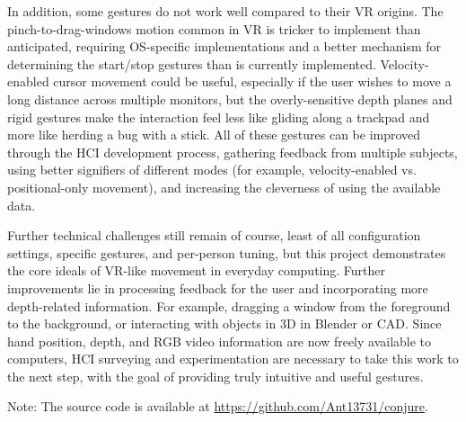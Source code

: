 \documentclass[12pt]{article}
\begin{document}
In addition, some gestures do not work well compared to their VR origins. The pinch-to-drag-windows motion common in VR is tricker to implement than anticipated, requiring OS-specific implementations and a better mechanism for determining the start/stop gestures than is currently implemented. Velocity-enabled cursor movement could be useful, especially if the user wishes to move a long distance across multiple monitors, but the overly-sensitive depth planes and rigid gestures make the interaction feel less like gliding along a trackpad and more like herding a bug with a stick. All of these gestures can be improved through the HCI development process, gathering feedback from multiple subjects, using better signifiers of different modes (for example, velocity-enabled vs. positional-only movement), and increasing the cleverness of using the available data.

Further technical challenges still remain of course, least of all configuration settings, specific gestures, and per-person tuning, but this project demonstrates the core ideals of VR-like movement in everyday computing. Further improvements lie in processing feedback for the user and incorporating more depth-related information. For example, dragging a window from the foreground to the background, or interacting with objects in 3D in Blender or CAD. Since hand position, depth, and RGB video information are now freely available to computers, HCI surveying and experimentation are necessary to take this work to the next step, with the goal of providing truly intuitive and useful gestures.

Note: The source code is available at \url{https://github.com/Ant13731/conjure}.






\pagebreak
\printbibliography
\end{document}

